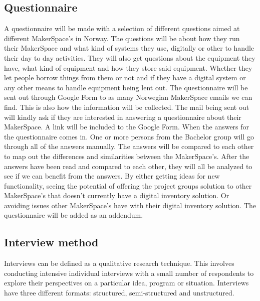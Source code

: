  \subsection{Questionnaire}
 
 A questionnaire will be made with a selection of different questions aimed at different MakerSpace's in Norway. The questions will be about how they run their MakerSpace and what kind of systems they use, digitally or other to handle their day to day activities. They will also get questions about the equipment they have, what kind of equipment and how they store said equipment. Whether they let people borrow things from them or not and if they have a digital system or any other means to handle equipment being lent out. 
 The questionnaire will be sent out through Google Form to as many Norwegian MakerSpace emails we can find. This is also how the information will be collected. The mail being sent out will kindly ask if they are interested in answering a questionnaire about their MakerSpace. A link will be included to the Google Form. 
 When the answers for the questionnaire comes in. One or more persons from the Bachelor group will go through all of the answers manually. The answers will be compared to each other to map out the differences and similarities between the MakerSpace's. After the answers have been read and compared to each other, they will all be analyzed to see if we can benefit from the answers. By either getting ideas for new functionality, seeing the potential of offering the project groups solution to other MakerSpace's that doesn't currently have a digital inventory solution. Or avoiding issues other MakerSpace's have with their digital inventory solution. The questionnaire will be added as an addendum.          
 
 \subsection{Interview method}
 
 Interviews can be defined as a qualitative research technique. This involves conducting intensive individual interviews with a small number of respondents to explore their perspectives on a particular idea, program or situation.\cite{Interview-Methods} Interviews have three different formats: structured, semi-structured and unstructured.

